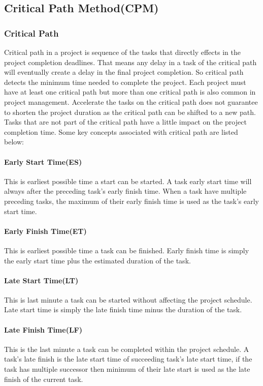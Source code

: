 \begin{spacing}{1}
\subsection{Critical Path Method(CPM)}
\subsubsection{Critical Path}
Critical path in a project is sequence of the tasks that directly effects in the project completion deadlines. That means any delay in a task of the critical path will eventually create a delay in the final project completion. So critical path detects the minimum time needed to complete the project. Each project must have at least one critical path but more than one critical path is also common in project management. Accelerate the tasks on the critical path does not guarantee to shorten the project duration as the critical path can be shifted to a new path. Tasks that are not part of the critical path have a little impact on the project completion time. Some key concepts associated with critical path are listed below:
 
 \paragraph{Early Start Time(ES)} 
 This is earliest possible time a start can be started. A task early start time will always after the preceding task's early finish time. When a task have multiple preceding tasks, the maximum of their early finish time is used as the task's early start time.
 \paragraph{Early Finish Time(ET)}
 This is earliest possible time a task can be finished. Early finish time is simply the early start time plus the estimated duration of the task.
 \paragraph{Late Start Time(LT)}
 This is last minute a task can be started without affecting the project schedule. Late start time is simply the late finish time minus the duration of the task.
 \paragraph{Late Finish Time(LF)}
 This is the last minute a task can be completed within the project schedule. A task's late finish is the late start time of succeeding task's late start time, if the task has multiple successor then minimum of their late start is used as the late finish of the current task.  

\end{spacing}
